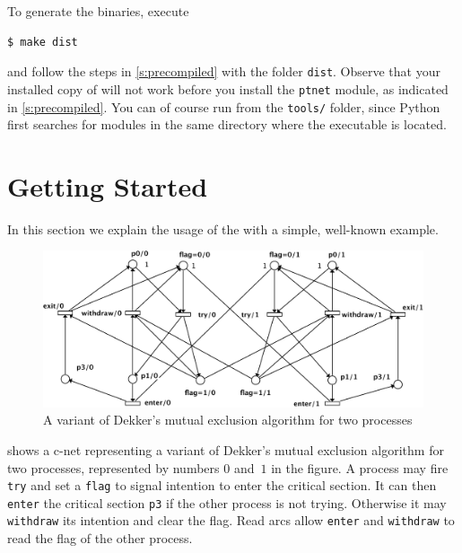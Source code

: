 \documentclass[a4paper]{refart}
\begin{document}
To generate the binaries, execute
\begin{verbatim}
$ make dist
\end{verbatim}
and follow the steps in \cref{s:precompiled} with the folder \verb!dist!.
Observe that your installed copy of \cna will not work before you install the
\verb!ptnet! module, as indicated in \cref{s:precompiled}.
You can of course run \cna from the \verb!tools/! folder, since Python first
searches for modules in the same directory where the executable is located.

\section{Getting Started}%
\label{s:getting}

In this section
we explain the usage of the \cunft{} with a simple, well-known example.

\begin{figure}[h]
\centering
\includegraphics[scale=0.50]{fig/dekker2.pdf}
\caption{A variant of Dekker's mutual exclusion algorithm for two processes}
\label{f:dekker}
\end{figure}

 shows a c-net representing a variant of Dekker's mutual
exclusion algorithm for two processes, represented by numbers $0$ and~$1$
in the figure.
A process may fire \verb!try! and set a
\verb!flag! to signal intention to enter the critical section. 
It can then \verb!enter! the critical section \verb!p3!
if the other process is not trying.
Otherwise it may \verb!withdraw! its intention and clear the flag.  Read arcs
allow \verb!enter! and \verb!withdraw! to read the flag of the other process.
\end{document}
